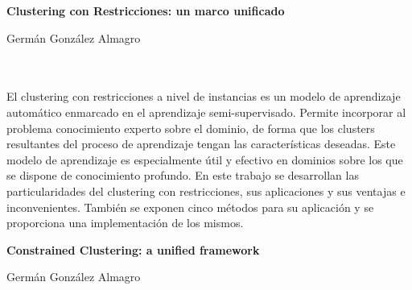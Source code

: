 

\cleardoublepage



\begin{center}
{\large\bfseries  Clustering con Restricciones: un marco unificado}\\
\end{center}
\begin{center}
Germán González Almagro\\
\end{center}

\\

\vspace{0.7cm}
\\

El clustering con restricciones a nivel de instancias es un modelo de aprendizaje automático enmarcado en el aprendizaje semi-supervisado. Permite incorporar al problema conocimiento experto sobre el dominio, de forma que los clusters resultantes del proceso de aprendizaje tengan las características deseadas. Este modelo de aprendizaje es especialmente útil y efectivo en dominios sobre los que se dispone de conocimiento profundo. En este trabajo se desarrollan las particularidades del clustering con restricciones, sus aplicaciones y sus ventajas e inconvenientes. También se exponen cinco métodos para su aplicación y se proporciona una implementación de los mismos.
\cleardoublepage


\thispagestyle{empty}


\begin{center}
{\large\bfseries Constrained Clustering: a unified framework}\\
\end{center}
\begin{center}
Germán González Almagro\\
\end{center}

\vspace{0.7cm}
\\

